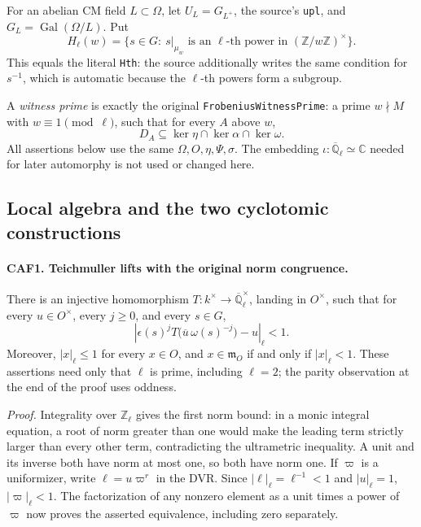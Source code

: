 \documentclass[11pt,a4paper]{article}
\numberwithin{equation}{section}
\theoremstyle{remark}\newtheorem{remark}[theorem]{Remark}
\begin{document}
For an abelian CM field \(L\subset\Omega\), let
\(U_L=G_{L^+}\), the source's \texttt{upl}, and
\(G_L=\operatorname{Gal}(\Omega/L)\).  Put
\[
 H_\ell(w)=\{s\in G:\ s|_{\mu_w}\text{ is an }\ell
                  \text{-th power in }(\mathbb Z/w\mathbb Z)^\times\}.
 \tag{CAF.3}
\]
This equals the literal \texttt{Hth}: the source additionally writes
the same condition for \(s^{-1}\), which is automatic because the
\(\ell\)-th powers form a subgroup.

A \emph{witness prime} is exactly the original
\texttt{Frobenius\allowbreak Witness\allowbreak Prime}: a prime \(w\nmid M\) with
\(w\equiv1\pmod\ell\), such that for every \(A\) above \(w\),
\[
          D_A\subseteq\ker\eta\cap\ker\alpha\cap\ker\omega.
 \tag{CAF.4}
\]
All assertions below use the same \(\Omega,O,\eta,\Psi,\sigma\).
The embedding \(\iota:\overline{\mathbb Q}_\ell\simeq\mathbb C\)
needed for later automorphy is not used or changed here.

\subsection{Local algebra and the two cyclotomic constructions}

\paragraph{CAF1. Teichmuller lifts with the original norm congruence.}
\label{claim:CAF1}
There is an injective homomorphism
\(T:k^\times\to\overline{\mathbb Q}_\ell^\times\), landing in
\(O^\times\), such that for every \(u\in O^\times\), every
\(j\ge0\), and every \(s\in G\),
\[
 \left|\epsilon(s)^j
       T\bigl(\overline u\,\omega(s)^{-j}\bigr)-u\right|_\ell<1.
 \tag{CAF.5}
\]
Moreover, \(|x|_\ell\le1\) for every \(x\in O\), and
\(x\in\mathfrak m_O\) if and only if \(|x|_\ell<1\).
These assertions need only that \(\ell\) is prime, including
\(\ell=2\); the parity observation at the end of the proof uses
oddness.

\emph{Proof.}
Integrality over \(\mathbb Z_\ell\) gives the first norm bound: in a
monic integral equation, a root of norm greater than one would make
the leading term strictly larger than every other term, contradicting
the ultrametric inequality.  A unit and its inverse both have norm at
most one, so both have norm one.  If \(\varpi\) is a uniformizer,
write \(\ell=u\varpi^r\) in the DVR.  Since
\(|\ell|_\ell=\ell^{-1}<1\) and \(|u|_\ell=1\),
\(|\varpi|_\ell<1\).  The factorization of any nonzero element as a
unit times a power of \(\varpi\) now proves the asserted equivalence,
including zero separately.
\end{document}
